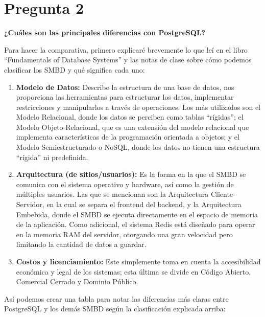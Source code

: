 
\section*{Pregunta 2} 
\textbf{¿Cuáles son las principales diferencias con PostgreSQL?}

Para hacer la comparativa, primero explicaré brevemente lo que leí en el libro ``Fundamentals of Database Systems'' \cite{elmasri2016} y las notas de clase \cite{01ConceptosBasicos} sobre cómo podemos clasificar los SMBD y qué significa cada uno:
\begin{enumerate}
    \item \textbf{Modelo de Datos:} Describe la estructura de una base de datos, nos proporciona las herramientas para estructurar los datos, implementar restricciones y manipularlos a través de operaciones. Los más utilizados son el Modelo Relacional, donde los datos se perciben como tablas ``rígidas''; el Modelo Objeto-Relacional, que es una extensión del modelo relacional que implementa características de la programación orientada a objetos; y el Modelo Semiestructurado o NoSQL, donde los datos no tienen una estructura ``rígida'' ni predefinida.
    
    \item \textbf{Arquitectura (de sitios/usuarios):} Es la forma en la que el SMBD se comunica con el sistema operativo y hardware, así como la gestión de múltiples usuarios. Las que se mencionan son la Arquitectura Cliente-Servidor, en la cual se separa el frontend del backend, y la Arquitectura Embebida, donde el SMBD se ejecuta directamente en el espacio de memoria de la aplicación. Como adicional, el sistema Redis está diseñado para operar en la memoria RAM del servidor, otorgando una gran velocidad pero limitando la cantidad de datos a guardar.

    \item \textbf{Costos y licenciamiento:} Este simplemente toma en cuenta la accesibilidad económica y legal de los sistemas; esta última se divide en Código Abierto, Comercial Cerrado y Dominio Público.
\end{enumerate}

Así podemos crear una tabla para notar las diferencias más claras entre PostgreSQL y los demás SMBD según la clasificación explicada arriba:

